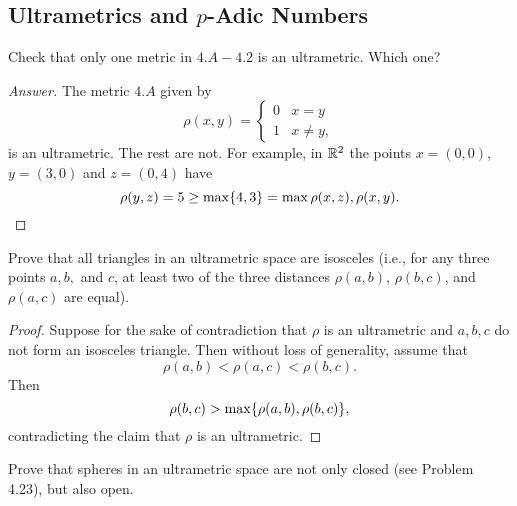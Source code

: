 \subsection{Ultrametrics and $p$-Adic Numbers}

\begin{majorEx}
    Check that only one metric in $4.A-4.2$ is an ultrametric. Which one?
\end{majorEx}

\begin{proof}[Answer]
    The metric $4.A$ given by
    \[
        \rho(x,y) = 
        \begin{cases}
            0 & x = y \\
            1 & x \ne y,
        \end{cases}
    \]
    is an ultrametric. The rest are not. For example, in $\mathbb{R}^2$ the points $x =
    (0,0)$, $y = (3,0)$ and $z = (0, 4)$ have
    \[
        \rho(y,z) = 5 \geq \max\{4, 3\} = \max{\rho(x,z), \rho(x,y)}.
    \]
\end{proof}

\begin{majorEx}
    Prove that all triangles in an ultrametric space are isosceles (i.e., for
    any three points $a,b,$ and $c$, at least two of the three distances
    $\rho(a,b)$, $\rho(b,c)$, and $\rho(a, c)$ are equal).
\end{majorEx}

\begin{proof}
    Suppose for the sake of contradiction that $\rho$ is an ultrametric and $a,
    b, c$ do not form an isosceles triangle. Then without loss of generality,
    assume that
    \[
        \rho(a,b) < \rho(a,c) < \rho(b,c).
    \]
    Then
    \[
        \rho(b,c) > \max\{\rho(a,b), \rho(b,c)\},
    \]
    contradicting the claim that $\rho$ is an ultrametric.
\end{proof}

\begin{majorEx}
    Prove that spheres in an ultrametric space are not only closed (see Problem
    4.23), but also open.
\end{majorEx}

